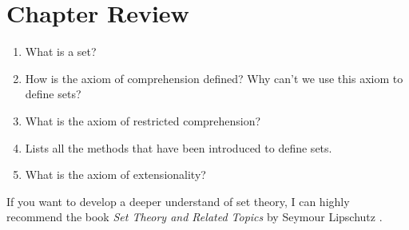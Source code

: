 \section{Chapter Review}
\begin{enumerate}
\item What is a set?
\item How is the axiom of comprehension defined?  Why can't we use this axiom to define sets?
\item What is the axiom of restricted comprehension?
\item Lists all the methods that have been introduced to define sets.
\item What is the axiom of extensionality?
\end{enumerate}
If you want to develop a deeper understand of set theory, I can highly recommend the book
\emph{Set Theory and Related Topics} by Seymour Lipschutz \cite{lipschutz:1998}.

